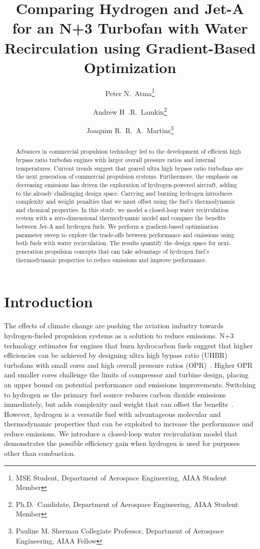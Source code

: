 \documentclass[conf]{new-aiaa}
\title{Comparing Hydrogen and Jet-A for an N+3 Turbofan with Water Recirculation using Gradient-Based Optimization} %
\author{Peter N.~Atma\footnote{MSE Student, Department of Aerospace Engineering, AIAA Student Member}}
\author{Andrew H~.R.~Lamkin\footnote{Ph.D.~Candidate, Department of Aerospace Engineering, AIAA Student Member}}
\author{Joaquim R.~R.~A.~Martins\footnote{Pauline M. Sherman Collegiate Professor, Department of Aerospace Engineering, AIAA Fellow}}
\affil{University of Michigan, Ann Arbor, MI, 48109}
\begin{document}
\maketitle

\begin{abstract}
  Advances in commercial propulsion technology led to the development of efficient high bypass ratio turbofan engines with larger overall pressure ratios and internal temperatures.
  Current trends suggest that geared ultra high bypass ratio turbofans are the next generation of commercial propulsion systems.
  Furthermore, the emphasis on decreasing emissions has driven the exploration of hydrogen-powered aircraft, adding to the already challenging design space.
  Carrying and burning hydrogen introduces complexity and weight penalties that we must offset using the fuel's thermodynamic and chemical properties.
  In this study, we model a closed-loop water recirculation system with a zero-dimensional thermodynamic model and compare the benefits between Jet-A and hydrogen fuels.
  We perform a gradient-based optimization parameter sweep to explore the trade-offs between performance and emissions using both fuels with water recirculation.
  The results quantify the design space for next-generation propulsion concepts that can take advantage of hydrogen fuel's thermodynamic properties to reduce emissions and improve performance.
\end{abstract}

\section{Introduction}
The effects of climate change are pushing the aviation industry towards hydrogen-fueled propulsion systems as a solution to reduce emissions.
N+3 technology estimates for engines that burn hydrocarbon fuels suggest that higher efficiencies can be achieved by designing ultra high bypass ratio (UHBR) turbofans with small cores and high overall pressure ratios (OPR)~\cite{Jones2017a}.
Higher OPR and smaller cores challenge the limits of compressor and turbine design, placing an upper bound on potential performance and emissions improvements.
Switching to hydrogen as the primary fuel source reduces carbon dioxide emissions immediately, but adds complexity and weight that can offset the benefits~\cite{Adler2023}.
However, hydrogen is a versatile fuel with advantageous molecular and thermodynamic properties that can be exploited to increase the performance and reduce emissions.
We introduce a closed-loop water recirculation model that demonstrates the possible efficiency gain when hydrogen is used for purposes other than combustion.
\end{document}

